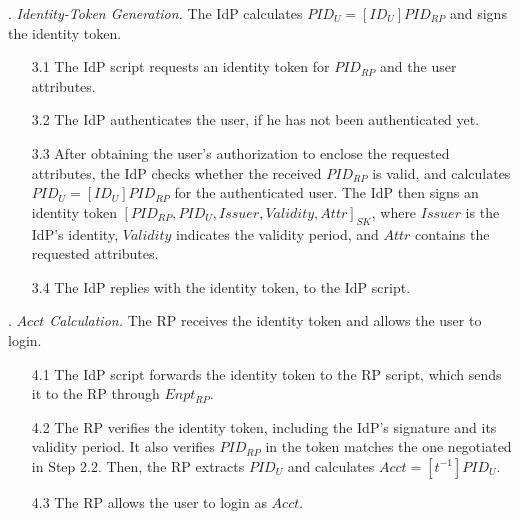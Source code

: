 . {\em Identity-Token Generation.}
The IdP calculates $PID_U = [ID_U]{PID_{RP}}$ and signs the identity token. %
\vspace{-\topsep}
\begin{itemize}
\setlength{\topsep}{0pt}
\setlength{\partopsep}{0pt}
\setlength{\itemsep}{0pt}
\setlength{\parsep}{0pt}
\setlength{\parskip}{0pt}
\item[3.1]
The IdP script requests an identity token for $PID_{RP}$ and the user attributes.

\item[3.2] The IdP authenticates the user, if he has not been authenticated yet.

\item [3.3]
After obtaining the user's authorization to enclose the requested attributes,
the IdP checks whether the received $PID_{RP}$ is valid,
    and calculates $PID_U = [ID_U]{PID_{RP}}$ for the authenticated user.
The IdP then signs an identity token $[PID_{RP}, PID_U, Issuer, Validity, Attr]_{SK}$,
 where $Issuer$ is the IdP's identity, $Validity$ indicates the validity period, and $Attr$ contains the requested attributes.
\item[3.4] The IdP replies with the identity token, to the IdP script.
\end{itemize}

. {\em $Acct$ Calculation.}
The RP receives the identity token and allows the user to login.
\vspace{-\topsep}
\begin{itemize}
\setlength{\topsep}{0pt}
\setlength{\partopsep}{0pt}
\setlength{\itemsep}{0pt}
\setlength{\parsep}{0pt}
\setlength{\parskip}{0pt}
\item [4.1]
The IdP script forwards the identity token to the RP script,
    which sends it to the RP through $Enpt_{RP}$.
\item[4.2] The RP verifies the identity token, including the IdP's signature and its validity period.
It also verifies $PID_{RP}$ in the token matches the one negotiated in Step 2.2.
Then, the RP extracts $PID_U$ and calculates $Acct = [t^{-1}]{PID_U}$.

\item [4.3] The RP allows the user to login as $Acct$.

\end{itemize}


